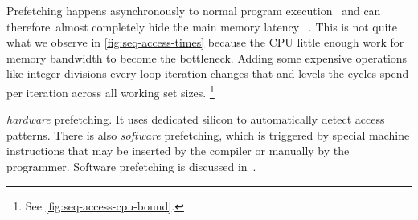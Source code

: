 Prefetching happens asynchronously to normal program execution~\cite[14]{drepper2007}
and can therefore\ almost completely hide the main memory latency%
~\cite[23]{drepper2007}.
This is not quite what we observe in \cref{fig:seq-access-times} because the CPU
 little enough work for memory bandwidth to become the
bottleneck.
%
%
%
Adding some expensive operations like integer divisions every loop iteration changes that
and  levels the cycles spend per iteration across all
working set sizes.%
\footnote{%
   See \vref{fig:seq-access-cpu-bound}.
}


 \emph{hardware} prefetching.  It
uses dedicated silicon to automatically detect access patterns.  There is also
\emph{software} prefetching, which is triggered by special machine instructions that may
be inserted by the compiler or manually by the programmer.  Software prefetching is
discussed in~\cite{drepper2007}.


